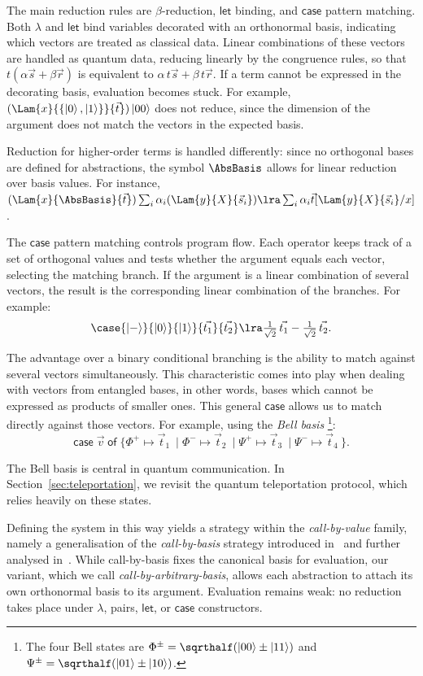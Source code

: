 The main reduction rules are $\beta$-reduction, $\mathsf{let}$ binding, and
$\mathsf{case}$ pattern matching.  
Both $\lambda$ and $\mathsf{let}$ bind variables decorated with an orthonormal
basis, indicating which vectors are treated as classical data.  Linear
combinations of these vectors are handled as quantum data, reducing linearly by
the congruence rules, so that $t(\alpha\vec s+\beta\vec r)$ is equivalent to
$\alpha\,t\vec s+\beta\,t\vec r$. If a term cannot be expressed in the decorating
basis, evaluation becomes stuck. For example, $(\Lam{x}{\{\ket{0},\ket{1}\}}{\vec{t}})
\ket{00}$ does not reduce, since the dimension of the argument does
not match the vectors in the expected basis.

Reduction for higher-order terms is handled differently: since no orthogonal bases
are defined for abstractions, the symbol $\AbsBasis$ allows for linear reduction
over basis values. For instance, 
$(\Lam{x}{\AbsBasis}{\vec t}) \sum_i
\alpha_i(\Lam{y}{X}{\vec{s}_{i}}) \lra \sum_i\alpha_i\vec
t[\Lam{y}{X}{\vec{s}_{i}}/x]$.

The $\mathsf{case}$ pattern matching controls program flow.  
Each operator keeps track of a set of orthogonal values and tests whether the
argument equals each vector, selecting the matching branch.  
If the argument is a linear combination of several vectors, the result is the
corresponding linear combination of the branches.  For example:
\[
  \case{\ket{-}}{\ket{0}}{\ket{1}}{\vec{t_1}}{\vec{t_2}} \lra
  \tfrac{1}{\sqrt{2}}\,\vec{t_1} - \tfrac{1}{\sqrt{2}}\,\vec{t_2}.
\]

The advantage over a binary conditional branching is the ability to match against
several vectors simultaneously.  This characteristic comes into play when dealing
with vectors from entangled bases, in other words, bases which cannot be expressed
as products of smaller ones.  This general $\mathsf{case}$ allows us to match
directly against those vectors.  For example, using the \emph{Bell basis}
\footnote{ The four Bell states are $\Phi^{\pm}=\sqrthalf(\ket{00}\pm\ket{11})$ and
$\Psi^{\pm}=\sqrthalf(\ket{01}\pm\ket{10})$.}:
\[
  \mathsf{case}\;\vec{v}\;\mathsf{of}\;\{
  \Phi^+ \mapsto \vec{t}_{1}\ \mid
  \Phi^- \mapsto \vec{t}_{2}\ \mid
  \Psi^+ \mapsto \vec{t}_{3}\ \mid
  \Psi^- \mapsto \vec{t}_{4}\ \}.
\]

The Bell basis is central in quantum communication. In
Section~\ref{sec:teleportation}, we revisit the quantum teleportation protocol,
which relies heavily on these states.

Defining the system in this way yields a strategy within the
\emph{call-by-value} family, namely a generalisation of the
\emph{call-by-basis} strategy introduced in~\cite{ArrighiDowekLMCS17} and
further analysed in~\cite{AssafDiazcaroPerdrixTassonValironLMCS14}. While
call-by-basis fixes the canonical basis for evaluation, our variant,
which we call \emph{call-by-arbitrary-basis}, allows each abstraction to attach
its own orthonormal basis to its argument. Evaluation remains weak: no
reduction takes place under $\lambda$, pairs, $\mathsf{let}$, or
$\mathsf{case}$ constructors.

